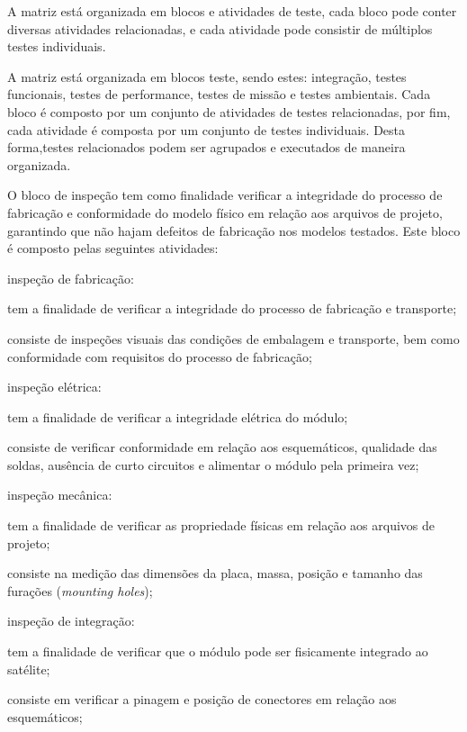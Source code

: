 A matriz está organizada em blocos e atividades de teste, cada bloco pode conter diversas atividades relacionadas, e cada atividade pode consistir de múltiplos testes individuais.

A matriz está organizada em blocos teste, sendo estes: integração, testes funcionais, testes de performance, testes de missão e testes ambientais.
Cada bloco é composto por um conjunto de atividades de testes relacionadas, por fim, cada atividade é composta por um conjunto de testes individuais.
Desta forma,testes relacionados podem ser agrupados e executados de maneira organizada.

O bloco de inspeção tem como finalidade verificar a integridade do processo de fabricação e conformidade do modelo físico em relação aos arquivos de projeto, garantindo que não hajam defeitos de fabricação nos modelos testados.
Este bloco é composto pelas seguintes atividades:

\begin{alineas}
    \item inspeção de fabricação:
    \begin{alineas}
        \item tem a finalidade de verificar a integridade do processo de fabricação e transporte;
        \item consiste de inspeções visuais das condições de embalagem e transporte, bem como conformidade com requisitos do processo de fabricação;
    \end{alineas}

    \item inspeção elétrica:
    \begin{alineas}
        \item tem a finalidade de verificar a integridade elétrica do módulo;
        \item consiste de verificar conformidade em relação aos esquemáticos, qualidade das soldas, ausência de curto circuitos e alimentar o módulo pela primeira vez;
    \end{alineas}

    \item inspeção mecânica:
    \begin{alineas}
        \item tem a finalidade de verificar as propriedade físicas em relação aos arquivos de projeto;
        \item consiste na medição das dimensões da placa, massa, posição e tamanho das furações (\textit{mounting holes});
    \end{alineas}

    \item inspeção de integração:
    \begin{alineas}
        \item tem a finalidade de verificar que o módulo pode ser fisicamente integrado ao satélite;
        \item consiste em verificar a pinagem e posição de conectores em relação aos esquemáticos;
    \end{alineas}
\end{alineas}


